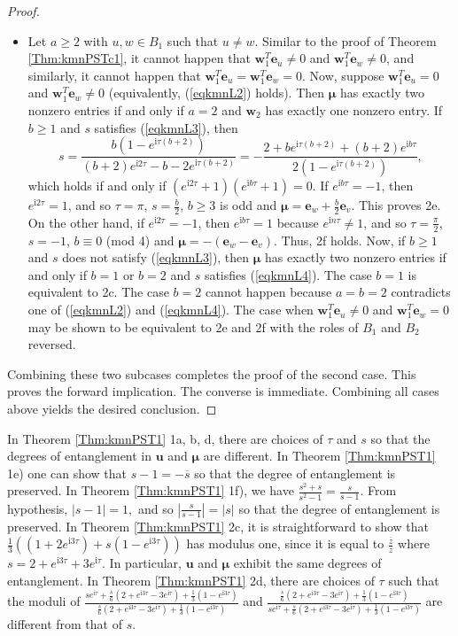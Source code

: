 \documentclass{article}
\numberwithin{equation}{section}
\newcommand{\be}{\mathbf e}
\newcommand{\bu}{\mathbf u}
\newcommand{\bw}{\mathbf w}
\newcommand{\bmu}{{\boldsymbol{\mu}}}
\def\ii{\mathrm{i}}
\begin{document}
{\begin{proof}
\begin{itemize}
\item Let $a\geq 2$ with $u,w\in  B_1$ such that $u\neq w$. Similar to the proof of Theorem \ref{Thm:kmnPSTc1}, it cannot happen that $\bw_1^T\be_u\neq 0$ and $\bw_1^T\be_w\neq 0$, and similarly, it cannot happen that $\bw_1^T\be_u=\bw_1^T\be_w=0$. Now, suppose $\bw_1^T\be_u=0$ and $\bw_1^T\be_w\neq 0$ (equivalently, (\ref{eqkmnL2}) holds). Then $\bmu$ has exactly two nonzero entries if and only if $a=2$ and $\bw_2$ has exactly one nonzero entry. If $b\geq 1$ and $s$ satisfies (\ref{eqkmnL3}), then 
\begin{equation*}
   s=\frac{b(1-e^{\ii \tau (b+2)})}{(b+2)e^{\ii 2\tau}-b-2e^{\ii \tau (b+2)}}=-\frac{2+be^{\ii \tau (b+2)}+(b+2)e^{\ii b \tau}}{2(1-e^{\ii \tau (b+2)})},    
\end{equation*}
which holds if and only if $(e^{\ii 2\tau}+1)(e^{\ii b\tau}+1)=0$. If $e^{\ii b\tau}=-1$, then $e^{\ii 2\tau}=1$, and so $\tau=\pi$, $s=\frac{b}{2}$, $b\geq 3$ is odd and $\bmu=\be_w+\frac{b}{2}\be_v$. This proves 2e. On the other hand, if $e^{\ii 2\tau}=-1$, then $e^{\ii b\tau}=1$ because $e^{\ii n\tau}\neq 1$, and so $\tau=\frac{\pi}{2}$, $s=-1$, $b\equiv 0$ (mod 4) and $\bmu=-(\be_w-\be_v)$. Thus, 2f holds.
Now, if $b\geq 1$ and $s$ does not satisfy (\ref{eqkmnL3}), then $\bmu$ has exactly two nonzero entries if and only if $b=1$ or $b=2$ and $s$ satisfies (\ref{eqkmnL4}). The case $b=1$ is equivalent to 2c. The case $b=2$ cannot happen because $a=b=2$ contradicts one of (\ref{eqkmnL2}) and (\ref{eqkmnL4}). The case when $\bw_1^T\be_u\neq 0$ and $\bw_1^T\be_w=0$ may be shown to be equivalent to 2e and 2f with the roles of $B_1$ and $B_2$ reversed.
\end{itemize}
Combining these two subcases completes the proof of the second case. This proves the forward implication. The converse is immediate.
Combining all cases above yields the desired conclusion.
\end{proof}

In Theorem  \ref{Thm:kmnPST1} 1a, b, d,  there are choices of $\tau$ and $s$ so that the degrees of entanglement in $\bu$ and $\bmu$ are different. In  Theorem  \ref{Thm:kmnPST1} 1e) one can show that $s-1=-\overline{s}$ so that the degree of entanglement is preserved. In Theorem  \ref{Thm:kmnPST1} 1f), we have $\frac{s^2+s}{s^2-1}=\frac{s}{s-1}.$ From hypothesis, $|s-1|=1,$ and so $|\frac{s}{s-1}|=|s|$ so that the degree of entanglement is preserved. 
In Theorem \ref{Thm:kmnPST1} 2c, it is straightforward to show that $\frac{1}{3}((1+2e^{\ii 3\tau})+s(1-e^{\ii 3\tau}))$ has modulus one, since it is equal to $\frac{\overline{z}}{z}$ where $s=2+e^{\ii 3\tau} +3e^{\ii \tau}$. In particular, $\bu$ and $\bmu$ exhibit the same degrees of entanglement. In Theorem \ref{Thm:kmnPST1} 2d, there are choices of $\tau$ such that the moduli of $\frac{se^{\ii \tau}+\frac{s}{6}(2+e^{\ii 3 \tau}-3e^{\ii \tau})+\frac{1}{3}(1-e^{\ii 3 \tau})}{\frac{s}{6}(2+e^{\ii 3 \tau}-3e^{\ii \tau})+\frac{1}{3}(1-e^{\ii 3 \tau})} $ and $\frac{\frac{s}{6}(2+e^{\ii 3 \tau}-3e^{\ii \tau})+\frac{1}{3}(1-e^{\ii 3 \tau})} 
{se^{\ii \tau}+\frac{s}{6}(2+e^{\ii 3 \tau}-3e^{\ii \tau})+\frac{1}{3}(1-e^{\ii 3 \tau})}$ are different from that of $s$. 




}
\end{document}
